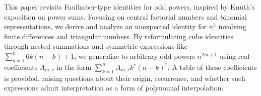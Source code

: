 This paper revisits Faulhaber-type identities for odd powers, inspired by Knuth’s exposition on power sums.
Focusing on central factorial numbers and binomial representations, we derive and analyze
an unexpected identity for $n^3$ involving finite differences and triangular numbers.
By reformulating cube identities through nested summations and symmetric expressions like
$\sum_{k=1}^n 6k(n-k) + 1$, we generalize to arbitrary odd powers $n^{2m+1}$
using real coefficients $A_{m,r}$ in the form $\sum_{k=1}^n A_{m,r} k^r(n-k)^r$.
A table of these coefficients is provided, raising questions about their origin, recurrence,
and whether such expressions admit interpretation as a form of polynomial interpolation.
